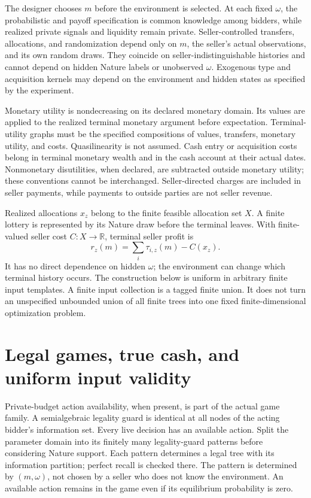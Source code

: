 \documentclass[11pt,a4paper]{article}
\numberwithin{equation}{section}
\theoremstyle{definition}
\newcommand{\R}{\mathbb R}
\begin{document}
The designer chooses \(m\) before the environment is selected.
At each fixed \(\omega\), the probabilistic and payoff specification
is common knowledge among bidders, while realized private signals and
liquidity remain private.
Seller-controlled transfers, allocations, and randomization depend only
on \(m\), the seller's actual observations, and its own random draws.
They coincide on seller-indistinguishable histories and cannot depend
on hidden Nature labels or unobserved \(\omega\).
Exogenous type and acquisition kernels may depend on the environment
and hidden states as specified by the experiment.

Monetary utility is nondecreasing on its declared monetary domain.
Its values are applied to the realized terminal monetary argument before
expectation. Terminal-utility graphs must be the specified compositions
of values, transfers, monetary utility, and costs.
Quasilinearity is not assumed.
Cash entry or acquisition costs belong in terminal monetary wealth and
in the cash account at their actual dates.
Nonmonetary disutilities, when declared, are subtracted outside monetary
utility; these conventions cannot be interchanged.
Seller-directed charges are included in seller payments, while payments
to outside parties are not seller revenue.

Realized allocations \(x_z\) belong to the finite feasible allocation
set \(X\). A finite lottery is represented by its Nature draw before
the terminal leaves.
With finite-valued seller cost \(C:X\to\R\), terminal seller profit is
\begin{equation}\label{eq:sellerleaf}
 r_z(m)=\sum_i\tau_{i,z}(m)-C(x_z).
\end{equation}
It has no direct dependence on hidden \(\omega\); the environment can
change which terminal history occurs.
The construction below is uniform in arbitrary finite input templates.
A finite input collection is a tagged finite union.
It does not turn an unspecified unbounded union of all finite trees
into one fixed finite-dimensional optimization problem.

\section{Legal games, true cash, and uniform input validity}\label{sec:validity}
Private-budget action availability, when present, is part of the actual
game family. A semialgebraic legality guard is identical at all nodes
of the acting bidder's information set.
Every live decision has an available action.
Split the parameter domain into its finitely many legality-guard
patterns before considering Nature support.
Each pattern determines a legal tree with its information partition;
perfect recall is checked there.
The pattern is determined by \((m,\omega)\), not chosen by a seller
who does not know the environment.
An available action remains in the game even if its equilibrium
probability is zero.
\end{document}
